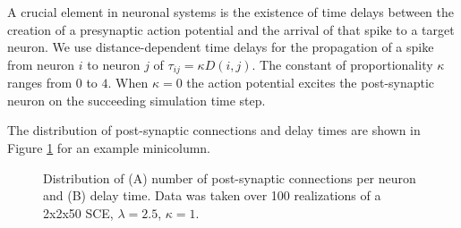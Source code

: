 A crucial element in neuronal systems is the existence of time delays between the creation of a presynaptic action potential and the arrival of that spike to a target neuron. 
We use distance-dependent time delays for the propagation of a spike from neuron $i$ to neuron $j$ of $\tau_{ij} = \kappa  D(i,j)$. 
The constant of proportionality $\kappa$ ranges from $0$ to $4$.
When $\kappa=0$ the action potential excites the post-synaptic neuron on the succeeding simulation time step.
 
The distribution of post-synaptic connections and delay times are shown in Figure \ref{fig:connection_delay_distrbution} for an example minicolumn.
\begin{figure}[!htb]
 \caption{Distribution of (A) number of post-synaptic connections per neuron and (B) delay time. Data was taken over 100 realizations of a 2x2x50 SCE, $\lambda=2.5$, $\kappa=1$.  } 
 \label{fig:connection_delay_distrbution}
\end{figure}
 \FloatBarrier
 

